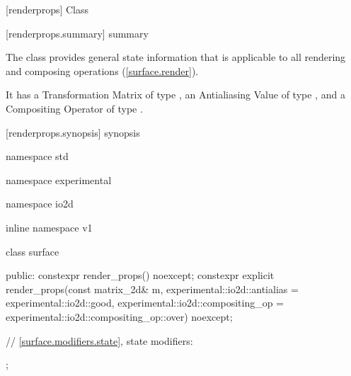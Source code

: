 
 [renderprops] {Class }

 [renderprops.summary] { summary}

\pnum
The  class provides general state information that is applicable to all rendering and composing operations (\ref{surface.render}).

\pnum
It has a Transformation Matrix of type , an Antialiasing Value of type , and a Compositing Operator of type .

 [renderprops.synopsis] { synopsis}

\begin{codeblock}
namespace std { namespace experimental { namespace io2d { inline namespace v1 {
  class surface {
  public:
    constexpr render_props() noexcept;
    constexpr explicit render_props(const matrix_2d& m,
      experimental::io2d::antialias = experimental::io2d::good,
      experimental::io2d::compositing_op = experimental::io2d::compositing_op::over) noexcept;
    
    // \ref{surface.modifiers.state}, state modifiers:
  };
}}}}
\end{codeblock}

